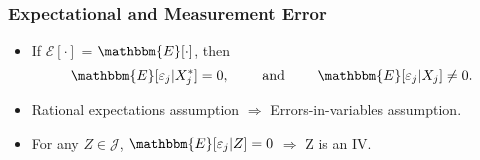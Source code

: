 \begin{frame}
\frametitle{Expectational and Measurement Error}

\begin{itemize}
	\item If $\mathcal{E}[\cdot]$ = $\mathbbm{E}[\cdot]$, then
	\begin{equation*}
	\mathbbm{E}[\varepsilon_{j}|X^{*}_{j}]=0,\qquad\text{ and }\qquad\mathbbm{E}[\varepsilon_{j}|X_{j}]\neq0.
	\end{equation*}
	\item Rational expectations assumption $\Longrightarrow$ Errors-in-variables assumption.
	\item For any $Z\in\mathcal{J}$, $\mathbbm{E}[\varepsilon_{j}|Z]=0$ $\Longrightarrow$ Z is an IV.
\end{itemize}
\end{frame}

